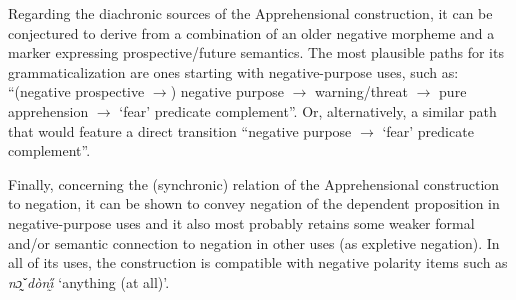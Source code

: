\documentclass[output=paper,colorlinks,citecolor=brown
]{langscibook}
\begin{document}
Regarding the diachronic sources of the Apprehensional construction, it can be conjectured to derive from a combination of an older negative morpheme and a marker expressing prospective\slash future semantics. The most plausible paths for its grammaticalization are ones starting with negative-purpose uses, such as: ``(negative prospective $\rightarrow$) negative purpose $\rightarrow$ warning\slash threat $\rightarrow$ pure apprehension $\rightarrow$ `fear' predicate complement''. Or, alternatively, a similar path that would feature a direct transition ``negative purpose $\rightarrow$ `fear' predicate complement''.

Finally, concerning the (synchronic) relation of the Apprehensional construction to negation, it can be shown to convey negation of the dependent proposition in negative-purpose uses and it also most probably retains some weaker formal and/or semantic connection to negation in other uses (as expletive negation). In all of its uses, the construction is compatible with negative polarity items such as \textit{nɔ̰̌ dònı̰̋} `anything (at all)'.
\end{document}
